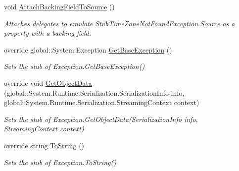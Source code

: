\begin{DoxyCompactItemize}
void \hyperlink{class_system_1_1_fakes_1_1_stub_time_zone_not_found_exception_aa349f1019729b4a19bb855a90998c2be}{Attach\-Backing\-Field\-To\-Source} ()
\begin{DoxyCompactList}\small\item\em Attaches delegates to emulate \hyperlink{class_system_1_1_fakes_1_1_stub_time_zone_not_found_exception_a6133b1edafae694abec6b0a0ce797f22}{Stub\-Time\-Zone\-Not\-Found\-Exception.\-Source} as a property with a backing field.\end{DoxyCompactList}\item 
override global\-::\-System.\-Exception \hyperlink{class_system_1_1_fakes_1_1_stub_time_zone_not_found_exception_a35a811756e8a73b6ce02d7fd7946a72f}{Get\-Base\-Exception} ()
\begin{DoxyCompactList}\small\item\em Sets the stub of Exception.\-Get\-Base\-Exception()\end{DoxyCompactList}\item 
override void \hyperlink{class_system_1_1_fakes_1_1_stub_time_zone_not_found_exception_a2a9bf99abed73687920900fa892abfd4}{Get\-Object\-Data} (global\-::\-System.\-Runtime.\-Serialization.\-Serialization\-Info info, global\-::\-System.\-Runtime.\-Serialization.\-Streaming\-Context context)
\begin{DoxyCompactList}\small\item\em Sets the stub of Exception.\-Get\-Object\-Data(\-Serialization\-Info info, Streaming\-Context context)\end{DoxyCompactList}\item 
override string \hyperlink{class_system_1_1_fakes_1_1_stub_time_zone_not_found_exception_a788d3506fcd054a5e7b920f23eb514a4}{To\-String} ()
\begin{DoxyCompactList}\small\item\em Sets the stub of Exception.\-To\-String()\end{DoxyCompactList}\end{DoxyCompactItemize}
